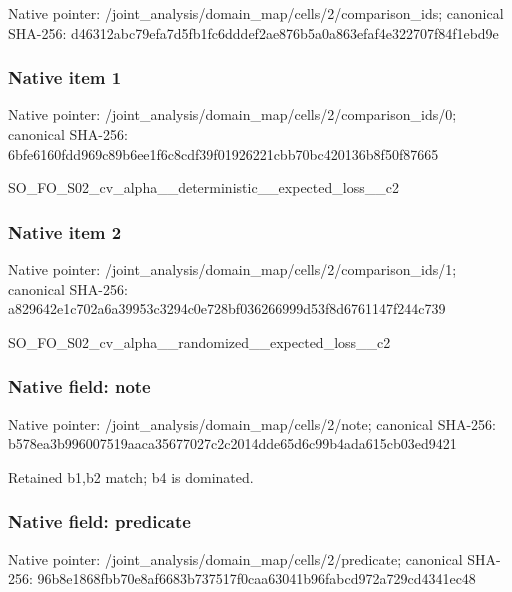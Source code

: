 \documentclass[10pt,a4paper]{article}
\begin{document}
Native pointer: /joint\_analysis/domain\_m\allowbreak{}ap/cells/2/comparison\_id\allowbreak{}s; canonical SHA-256: d46312abc79efa7d5fb1fc6d\allowbreak{}ddef2ae876b5a0a863efaf4e\allowbreak{}322707f84f1ebd9e



\subsubsection{Native item 1}


Native pointer: /joint\_analysis/domain\_m\allowbreak{}ap/cells/2/comparison\_id\allowbreak{}s/0; canonical SHA-256: 6bfe6160fdd969c89b6ee1f6\allowbreak{}c8cdf39f01926221cbb70bc4\allowbreak{}20136b8f50f87665


SO\_FO\_S02\_cv\_alpha\_\_dete\allowbreak{}rministic\_\_expected\_loss\allowbreak{}\_\_c2


\subsubsection{Native item 2}


Native pointer: /joint\_analysis/domain\_m\allowbreak{}ap/cells/2/comparison\_id\allowbreak{}s/1; canonical SHA-256: a829642e1c702a6a39953c32\allowbreak{}94c0e728bf036266999d53f8\allowbreak{}d6761147f244c739


SO\_FO\_S02\_cv\_alpha\_\_rand\allowbreak{}omized\_\_expected\_loss\_\_c\allowbreak{}2


\subsubsection{Native field: note}


Native pointer: /joint\_analysis/domain\_map/cells/2/note; canonical SHA-256: b578ea3b996007519aaca356\allowbreak{}77027c2c2014dde65d6c99b4\allowbreak{}ada615cb03ed9421


Retained b1,b2 match; b4 is dominated.


\subsubsection{Native field: predicate}


Native pointer: /joint\_analysis/domain\_m\allowbreak{}ap/cells/2/predicate; canonical SHA-256: 96b8e1868fbb70e8af6683b7\allowbreak{}37517f0caa63041b96fabcd9\allowbreak{}72a729cd4341ec48
\end{document}
